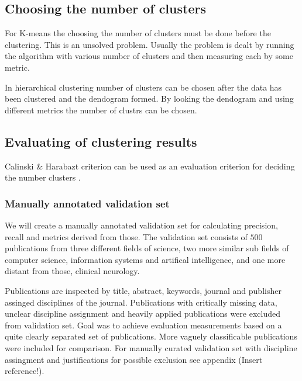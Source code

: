

\subsection{Choosing the number of clusters}

For K-means the choosing the number of clusters must be done before
the clustering. This is an unsolved problem. 
Usually the 
problem is dealt by running the algorithm with various number of 
clusters and then measuring each by some metric. 

In hierarchical clustering number of clusters can be chosen after 
the data has been clustered and the dendogram formed. 
 By 
looking the dendogram and using different metrics the number of 
clustrs can be chosen.


\subsection{Evaluating of clustering results}
Calinski \& Harabazt criterion can be used as an evaluation 
criterion for deciding the number clusters . 

\subsubsection{Manually annotated validation set}
We will create a manually annotated validation set for calculating
precision, recall and metrics derived from those.
The validation
set consists of $500$ publications from three different fields of
science, two more similar sub fields of computer science, 
information systems and artifical intelligence, and one more
distant from those, clinical neurology. 

Publications are inspected by title, abstract, keywords, journal
and publisher assinged disciplines of the journal. Publications
with critically missing data, unclear discipline assignment and
heavily applied publications were excluded from validation set.
Goal was to achieve evaluation measurements based on a quite 
clearly separated set of publications. More vaguely classificable
publications were included for comparison. For manually curated 
validation set with discipline assingment and justifications for
possible exclusion see appendix (Insert reference!).

